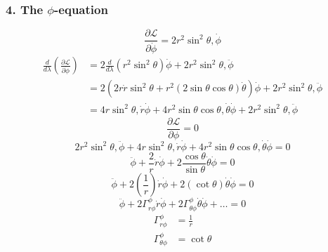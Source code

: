 \documentclass[11pt, a4paper]{report}
\begin{document}
\subsubsection*{4. The $\phi$-equation}
\begin{equation}
\frac{\partial \mathcal{L}}{\partial \dot{\phi}} = 2r^2 \sin^2\theta , \dot{\phi}
\end{equation}
\begin{align}
\frac{d}{d\lambda} \left( \frac{\partial \mathcal{L}}{\partial \dot{\phi}} \right) &= 2 \frac{d}{d\lambda} (r^2 \sin^2\theta) \dot{\phi} + 2r^2 \sin^2\theta , \ddot{\phi} \nonumber \\
&= 2 \left( 2r\dot{r} \sin^2\theta + r^2 (2\sin\theta\cos\theta)\dot{\theta} \right) \dot{\phi} + 2r^2 \sin^2\theta , \ddot{\phi} \nonumber \\
&= 4r\sin^2\theta , \dot{r}\dot{\phi} + 4r^2 \sin\theta \cos\theta , \dot{\theta}\dot{\phi} + 2r^2 \sin^2\theta , \ddot{\phi}
\end{align}
\begin{equation}
\frac{\partial \mathcal{L}}{\partial \phi} = 0
\end{equation}
\begin{equation}
2r^2 \sin^2\theta , \ddot{\phi} + 4r\sin^2\theta , \dot{r}\dot{\phi} + 4r^2 \sin\theta \cos\theta , \dot{\theta}\dot{\phi} = 0
\end{equation}
\begin{equation}
\ddot{\phi} + \frac{2}{r} \dot{r}\dot{\phi} + 2 \frac{\cos\theta}{\sin\theta} \dot{\theta}\dot{\phi} = 0
\end{equation}
\begin{equation}
\ddot{\phi} + 2 \left(\frac{1}{r}\right) \dot{r}\dot{\phi} + 2 (\cot\theta) \dot{\theta}\dot{\phi} = 0 \label{eq:geo_phi}
\end{equation}
\begin{equation}
\ddot{\phi} + 2\Gamma^\phi_{r\phi}\dot{r}\dot{\phi} + 2\Gamma^\phi_{\theta\phi}\dot{\theta}\dot{\phi} + \dots = 0
\end{equation}
\begin{align}
\Gamma^\phi_{r\phi} &= \frac{1}{r} \\
\Gamma^\phi_{\theta\phi} &= \cot\theta
\end{align}
\end{document}
